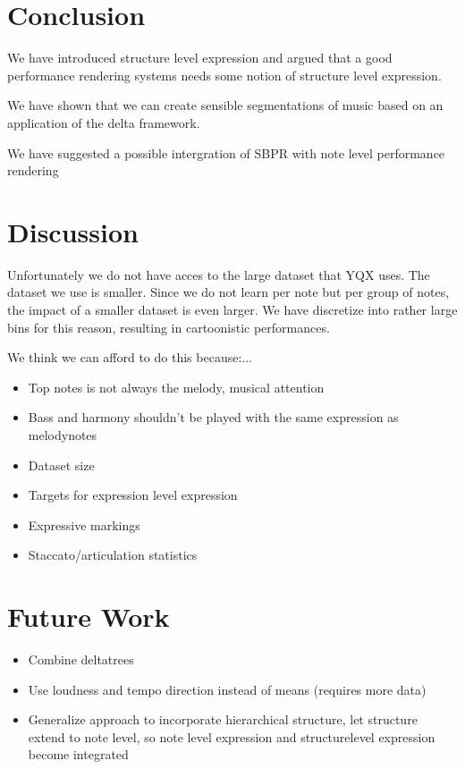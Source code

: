 \documentclass[a4paper,10pt]{article}
\begin{document}
\section{Conclusion}
We have introduced structure level expression and argued that a good performance rendering systems needs some notion of structure level expression. 

We have shown that we can create sensible segmentations of music based on an application of the delta framework. \cite{markwin} 

We have suggested a possible intergration of SBPR with note level performance rendering
\section{Discussion}

Unfortunately we do not have acces to the large dataset that YQX uses. The dataset we use is smaller. Since we do not learn per note but per group of notes, the impact of a smaller dataset is even larger. We have discretize into rather large bins for this reason, resulting in cartoonistic performances. 

We think we can afford to do this because:...

\begin{itemize}
\item Top notes is not always the melody, musical attention
\item Bass and harmony shouldn't be played with the same expression as melodynotes
\item Dataset size
\item Targets for expression level expression
\item Expressive markings
\item Staccato/articulation statistics
\end{itemize}

\section{Future Work}
\begin{itemize}
\item Combine deltatrees
\item Use loudness and tempo direction instead of means (requires more data)
\item Generalize approach to incorporate hierarchical structure, let structure extend to note level, so note level expression and structurelevel expression become integrated
\end{itemize}
\end{document}
